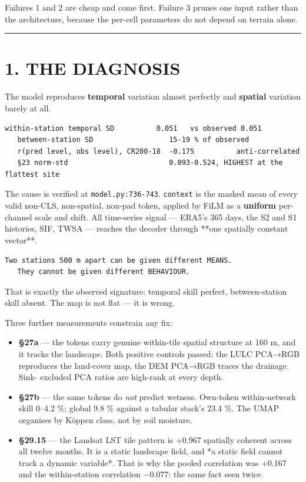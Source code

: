 \documentclass[10pt,a4paper]{article}
\begin{document}
Failures 1 and 2 are cheap and come first. Failure 3 prunes one input rather
than the architecture, because the per-cell parameters do not depend on terrain
alone.

\medskip\hrule\medskip

\section*{1. THE DIAGNOSIS}

The model reproduces \textbf{temporal} variation almost perfectly and \textbf{spatial}
variation barely at all.

\begin{Verbatim}[fontsize=\scriptsize,frame=leftline,framerule=0.6pt,rulecolor=\color{rulegray},xleftmargin=6pt,framesep=6pt,]
   within-station temporal SD          0.051   vs observed 0.051
   between-station SD                  15-19 % of observed
   r(pred level, obs level), CR200-18  -0.175          anti-correlated
   §23 norm-std                        0.093-0.524, HIGHEST at the flattest site
\end{Verbatim}

The cause is verified at \texttt{model.py:736-743}. \texttt{context} is the masked mean of
every valid non-CLS, non-spatial, non-pad token, applied by FiLM as a \textbf{uniform}
per-channel scale and shift. All time-series signal — ERA5's 365 days, the S2
and S1 histories, SIF, TWSA — reaches the decoder through **one spatially
constant vector**.

\begin{Verbatim}[fontsize=\scriptsize,frame=leftline,framerule=0.6pt,rulecolor=\color{rulegray},xleftmargin=6pt,framesep=6pt,]
   Two stations 500 m apart can be given different MEANS.
   They cannot be given different BEHAVIOUR.
\end{Verbatim}

That is exactly the observed signature: temporal skill perfect, between-station
skill absent. The map is not flat — it is wrong.

Three further measurements constrain any fix:

\begin{itemize}[leftmargin=1.2em,itemsep=1pt,topsep=3pt]
\item \textbf{§27a} — the tokens carry genuine within-tile spatial structure at 160 m,
and it tracks the landscape. Both positive controls passed: the LULC PCA→RGB
reproduces the land-cover map, the DEM PCA→RGB traces the drainage. Sink-
excluded PCA ratios are high-rank at every depth.
\item \textbf{§27b} — the same tokens do \emph{not} predict wetness. Own-token within-network
skill 0–4.2 \%; global 9.8 \% against a tabular stack's 23.4 \%. The UMAP
organises by Köppen class, not by soil moisture.
\item \textbf{§29.15} — the Landsat LST tile pattern is +0.967 spatially coherent across
all twelve months. It is a static landscape field, and *a static field cannot
track a dynamic variable*. That is why the pooled correlation was +0.167 and
the within-station correlation −0.077: the same fact seen twice.
\end{itemize}
\end{document}
